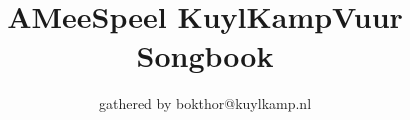 \documentclass[a4,openany,landscape]{article}
\title{AMeeSpeel KuylKampVuur Songbook}
\author{gathered by bokthor@kuylkamp.nl}
\begin{document}

\maketitle





\begin{songs}{} %



						
	
	
	
	
	
	
	
	
	
	
	
	
	
	
	
	
	


%			
\end{songs}




\end{document}
